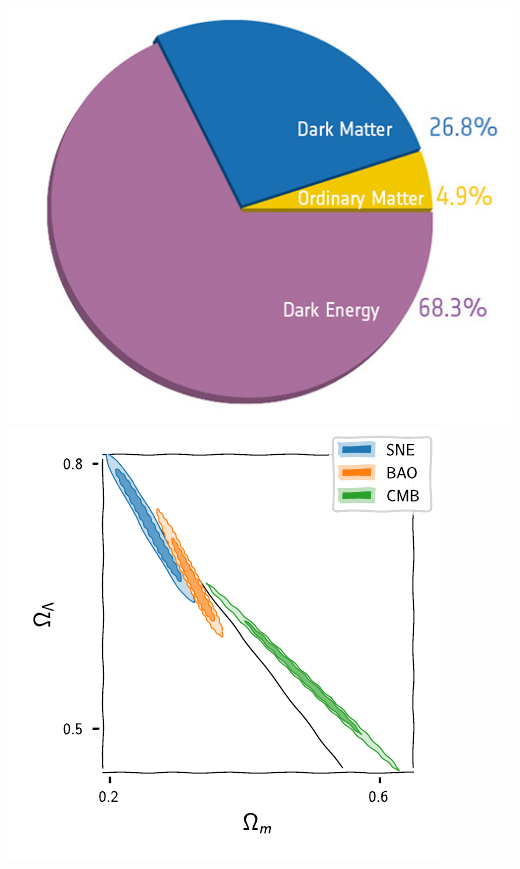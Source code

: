 \documentclass[aspectratio=169]{beamer}
\begin{document}
\begin{frame}
\begin{columns}
        \includegraphics[width=\textwidth]{figures/darkmatterchart_squared}
        \includegraphics[width=\textwidth]{figures/universe_constraints_zoom}
    \end{columns}

    
\end{frame}
\end{document}
